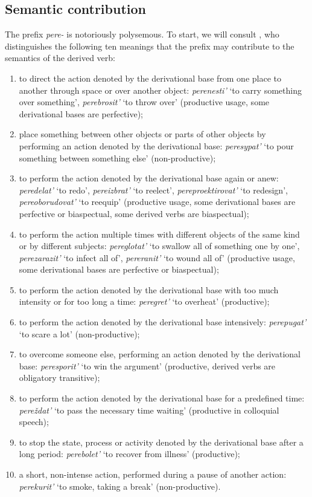 \subsection{Semantic contribution}
The prefix \textit{pere-} is notoriously polysemous. To start, we will consult \citet[pp. 363--364]{Shvedova:82}, who distinguishes the following ten meanings that the prefix may contribute to the semantics of the derived verb:
\begin{enumerate}
\item to direct the action denoted by the derivational base from one place to another through space or over another object: \textit{perenesti'} `to carry something over something', \textit{perebrosit'} `to throw over' (productive usage, some derivational bases are perfective); 
\item place something between other objects or parts of other objects by performing an action denoted by the derivational base: \textit{peresypat'} `to pour something between something else' (non-productive); 
\item to perform the action denoted by the derivational base again or anew: \textit{peredelat'} `to redo', \textit{pereizbrat'} `to reelect', \textit{pereproektirovat'} `to redesign', \textit{pereoborudovat'} `to reequip' (productive usage, some derivational bases are perfective or biaspectual, some derived verbs are biaspectual);
\item to perform the action multiple times with different objects of the same kind or by different subjects: \textit{pereglotat'} `to swallow all of something one by one', \textit{perezarazit'} `to infect all of', \textit{pereranit'} `to wound all of' (productive usage, some derivational bases are perfective or biaspectual);
\item to perform the action denoted by the derivational base with too much intensity or for too long a time: \textit{peregret'} `to overheat' (productive); 
\item to perform the action denoted by the derivational base intensively: \textit{perepugat'} `to scare a lot' (non-productive); 
\item to overcome someone else, performing an action denoted by the derivational base: \textit{peresporit'} `to win the argument' (productive, derived verbs are obligatory transitive); 
\item to perform the action denoted by the derivational base for a predefined time: \textit{pere\v{z}dat'} `to pass the necessary time waiting' (productive in colloquial speech);
\item to stop the state, process or activity denoted by the derivational base after a long period: \textit{perebolet'} `to recover from illness' (productive); 
\item a short, non-intense action, performed during a pause of another action: \textit{perekurit'} `to smoke, taking a break' (non-productive).
\end{enumerate} 

